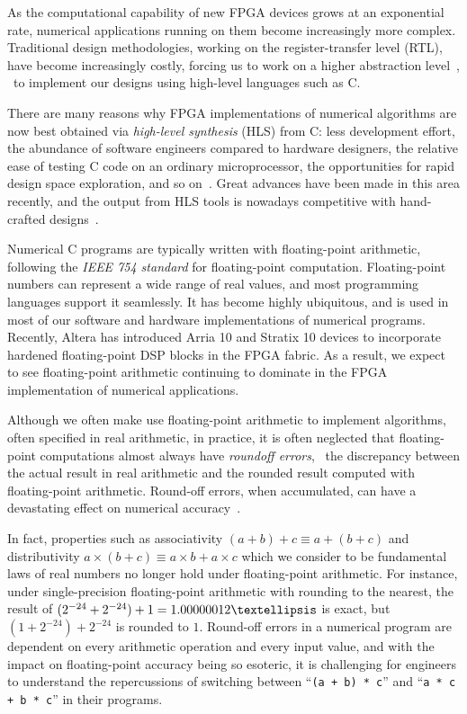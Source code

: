 As the computational capability of new FPGA devices grows at an exponential
rate, numerical applications running on them become increasingly more complex.
Traditional design methodologies, working on the register-transfer level (RTL),
have become increasingly costly, forcing us to work on a higher abstraction
level~\cite{gajski}, \ie~to implement our designs using high-level languages
such as C\@.

There are many reasons why FPGA implementations of numerical algorithms
are now best obtained via \emph{high-level synthesis} (HLS) from C\@:
less development effort, the abundance of software engineers compared to
hardware designers, the relative ease of testing C code on an ordinary
microprocessor, the opportunities for rapid design space exploration, and
so on~\cite{meeus12}. Great advances have been made in this area recently,
and the output from HLS tools is nowadays competitive with hand-crafted
designs~\cite{bdti_xilinx}.

Numerical C programs are typically written with floating-point arithmetic,
following the \emph{IEEE 754 standard} for floating-point computation.
Floating-point numbers can represent a wide range of real values, and most
programming languages support it seamlessly.  It has become highly ubiquitous,
and is used in most of our software and hardware implementations of numerical
programs.  Recently, Altera has introduced Arria 10 and Stratix 10 devices
to incorporate hardened floating-point DSP blocks in the FPGA fabric.  As a
result, we expect to see floating-point arithmetic continuing to dominate in
the FPGA implementation of numerical applications.

Although we often make use floating-point arithmetic to implement algorithms,
often specified in real arithmetic, in practice, it is often neglected that
floating-point computations almost always have \emph{roundoff errors}, \ie~the
discrepancy between the actual result in real arithmetic and the rounded result
computed with floating-point arithmetic.  Round-off errors, when accumulated,
can have a devastating effect on numerical accuracy~\cite{higham02}.

In fact, properties such as associativity $(a + b) + c \equiv a + (b + c)$
and distributivity $a \times (b + c) \equiv a \times b + a \times c$ which
we consider to be fundamental laws of real numbers no longer hold under
floating-point arithmetic.  For instance, under single-precision floating-point
arithmetic with rounding to the nearest, the result of $(2^{-24} + 2^{-24})
+ 1 = 1.00000012\textellipsis$ is exact, but $(1 + 2^{-24}) + 2^{-24}$ is
rounded to $1$.  Round-off errors in a numerical program are dependent on
every arithmetic operation and every input value, and with the impact on
floating-point accuracy being so esoteric, it is challenging for engineers to
understand the repercussions of switching between ``\verb|(a + b) * c|'' and
``\verb|a * c + b * c|'' in their programs.

